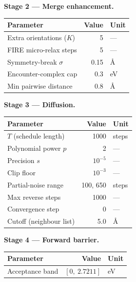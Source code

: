 \bigskip

\noindent\textbf{Stage 2 --- Merge enhancement.}\par\nopagebreak
\noindent\begin{tabular}{p{5cm}rl}
\toprule
Parameter & Value & Unit \\
\midrule
Extra orientations ($K$) & 5 & --- \\
FIRE micro-relax steps & 5 & --- \\
Symmetry-break $\sigma$ & 0.15 & \AA \\
Encounter-complex cap & 0.3 & eV \\
Min pairwise distance & 0.8 & \AA \\
\bottomrule
\end{tabular}

\bigskip

\noindent\textbf{Stage 3 --- Diffusion.}\par\nopagebreak
\noindent\begin{tabular}{p{5cm}rl}
\toprule
Parameter & Value & Unit \\
\midrule
$T$ (schedule length) & 1000 & steps \\
Polynomial power $p$ & 2 & --- \\
Precision $s$ & $10^{-5}$ & --- \\
Clip floor & $10^{-3}$ & --- \\
Partial-noise range & 100, 650 & steps \\
Max reverse steps & 1000 & --- \\
Convergence step & 0 & --- \\
Cutoff (neighbour list) & 5.0 & \AA \\
\bottomrule
\end{tabular}

\bigskip

\noindent\textbf{Stage 4 --- Forward barrier.}\par\nopagebreak
\noindent\begin{tabular}{p{5cm}rl}
\toprule
Parameter & Value & Unit \\
\midrule
Acceptance band & $[0,\ 2.7211]$ & eV \\
\bottomrule
\end{tabular}

\bigskip

